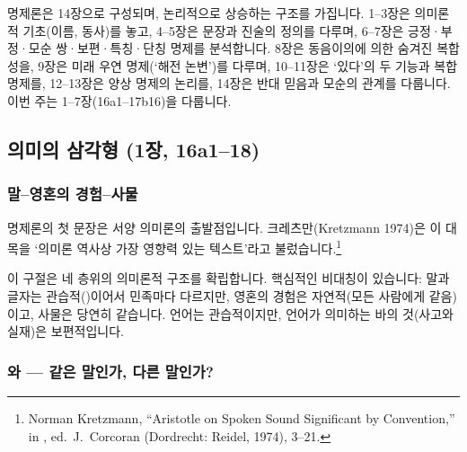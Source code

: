 \documentclass[12pt, a4paper]{article}
\begin{document}
명제론은 14장으로 구성되며, 논리적으로 상승하는 구조를 가집니다. 1--3장은 의미론적 기초(이름, 동사)를 놓고, 4--5장은 문장과 진술의 정의를 다루며, 6--7장은 긍정·부정·모순 쌍·보편·특칭·단칭 명제를 분석합니다. 8장은 동음이의에 의한 숨겨진 복합성을, 9장은 미래 우연 명제(`해전 논변')를 다루며, 10--11장은 `있다'의 두 기능과 복합 명제를, 12--13장은 양상 명제의 논리를, 14장은 반대 믿음과 모순의 관계를 다룹니다. 이번 주는 1--7장(16a1--17b16)을 다룹니다.

\subsection{의미의 삼각형 (1장, 16a1--18)}

\subsubsection{말--영혼의 경험--사물}

명제론의 첫 문장은 서양 의미론의 출발점입니다. 크레츠만(Kretzmann 1974)은 이 대목을 `의미론 역사상 가장 영향력 있는 텍스트'라고 불렀습니다.\footnote{Norman Kretzmann, ``Aristotle on Spoken Sound Significant by Convention,'' in , ed.\ J.\ Corcoran (Dordrecht: Reidel, 1974), 3--21.}


이 구절은 네 층위의 의미론적 구조를 확립합니다. 핵심적인 비대칭이 있습니다: 말과 글자는 관습적()이어서 민족마다 다르지만, 영혼의 경험은 자연적(모든 사람에게 같음)이고, 사물은 당연히 같습니다. 언어는 관습적이지만, 언어가 의미하는 바의 것(사고와 실재)은 보편적입니다.

\subsubsection{와  --- 같은 말인가, 다른 말인가?}
\end{document}
